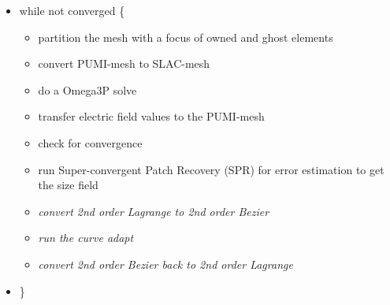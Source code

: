 \documentclass[review,authoryear,12pt]{elsarticle_summary_report}
\begin{document}
\begin{itemize}
  \item[] while not converged \{
   \begin{itemize}
          \item partition the mesh with a focus of owned and ghost elements
          \item convert PUMI-mesh to SLAC-mesh
	  \item do a Omega3P solve %
	  \item transfer electric field values to the PUMI-mesh
          \item check for convergence
          \item run Super-convergent Patch Recovery (SPR) for error estimation to get the size field
	  \item \textit{convert 2nd order Lagrange to 2nd order Bezier} %
	  \item \textit{run the curve adapt}
	  \item \textit{convert 2nd order Bezier back to 2nd order Lagrange} %
   \end{itemize}

 \item[] \}
\end{itemize}
\end{document}
